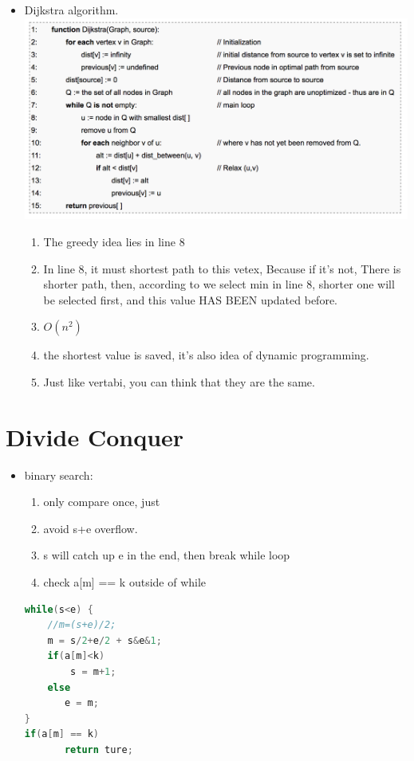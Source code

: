 \documentclass[a4paper,12pt,twoside]{book}
\begin{document}
\begin{itemize}
\item Dijkstra algorithm.  \newline
\includegraphics[scale=0.45]{pics/Dijkstra.png} \newline
\begin{enumerate}
\item The greedy idea lies in line 8
\item In line 8, it must shortest path to this vetex,  Because if it's not, There is shorter path, then, according to we select min in line 8, shorter one will be selected first, and this value HAS BEEN updated before. 
\item $O(n^{2})$
\item the shortest value is saved, it's also idea of dynamic programming.
\item Just like vertabi, you can think that they are the same. 
\end{enumerate}

\end{itemize}

\section{Divide Conquer}
\begin{itemize}
\item binary search:
\begin{enumerate}
\item only compare once, just  
\item avoid s+e overflow.
\item s will catch up e in the end, then break while loop 
\item check a[m] == k outside of while
\end{enumerate}

\begin{lstlisting}[frame=single, language=c++]
while(s<e) {
    //m=(s+e)/2;
    m = s/2+e/2 + s&e&1;
    if(a[m]<k)
        s = m+1;
    else 
       e = m;
}
if(a[m] == k) 
       return ture; 
\end{lstlisting}
\end{itemize} 
\end{document}
